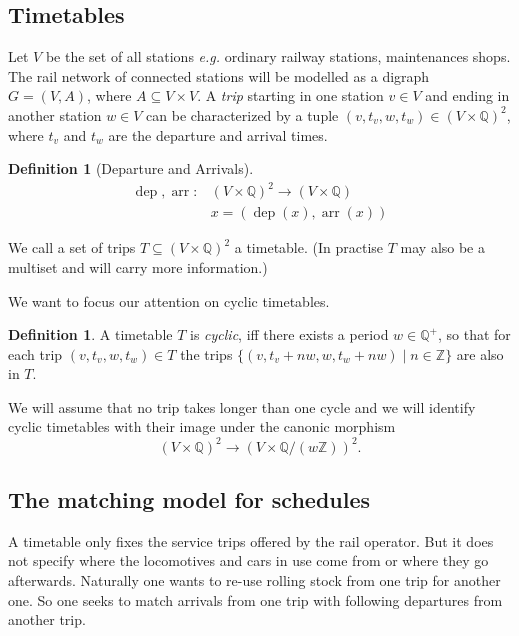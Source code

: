 \documentclass[a4paper]{amsart}
\theoremstyle{definition}
\newtheorem{defn}[theorem]{Definition}
\theoremstyle{remark}
\def\eg{\emph{e.g.}}
\newcommand{\rationals}{\ensuremath{\mathbb{Q}}}
\newcommand{\lr}[1]{\ensuremath{\left( #1 \right)}}
\begin{document}
\subsection{Timetables}

Let \(V\) be the set of all stations \eg{} ordinary railway stations,
maintenances shops.  The rail network of connected stations will be
modelled as a digraph \(G = (V,A)\), where \(A \subseteq V \times V\).
A \label{trip} \textit{trip} starting in one station \(v \in V\) and ending in another
station \(w \in V\) can be characterized by a tuple \((v, t_v, w, t_w)
\in \left(V \times \rationals\right)^2 \),
where \(t_v\) and \(t_w\) are the departure and arrival times.
\newcommand\dep[0]{\ensuremath{\operatorname{dep}}}
\newcommand\arr[0]{\ensuremath{\operatorname{arr}}}
\begin{defn}[Departure and Arrivals]
  \begin{align*}
    \dep, \arr \colon & \lr{V \times \rationals}^2 \to \lr{V \times \rationals} \\
    & x = \lr{\dep \lr{x}, \arr \lr{x}}
  \end{align*}
\end{defn}
We call a set of trips \(T \subseteq \left(V \times
  \rationals\right)^2\) a timetable.  (In practise \(T\) may also be a
multiset and will carry more information.)

We want to focus our attention on cyclic timetables.
\begin{defn} A timetable \(T\) is \label{cyclic} \textit{cyclic}, iff
  there exists a period \(w \in \rationals^+\), so that for each trip
  \((v, t_v, w, t_w) \in T\) the trips \(\{(v, t_v+n w, w, t_w +n w)
  \mid n \in \mathbb{Z}\}\) are also in \(T\).
\end{defn}
We will assume that no trip takes longer than one cycle and
we will identify cyclic timetables with their image under the canonic
morphism
\[\left(V \times \rationals\right)^2 \to
\left(V \times \rationals/{\left(w \mathbb{Z}\right)}\right)^2\text{.}\]

\subsection{The matching model for schedules}

A timetable only fixes the service trips offered by the rail operator.  But
it does not specify where the locomotives and cars in use come from or
where they go afterwards.  Naturally one wants to re-use rolling stock
from one trip for another one.  So one seeks to match arrivals from
one trip with following departures from another trip.
\end{document}
